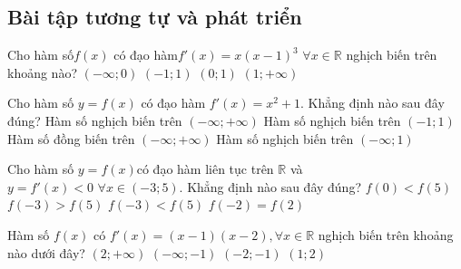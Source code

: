 \subsection{Bài tập tương tự và phát triển}
\begin{ex}%
	Cho hàm số$ f(x)$ có đạo hàm$f'(x)=x\left(x-1\right)^3\,\,\forall x\in \mathbb{R}$ nghịch biến trên khoảng nào?
	\choice
	{$\left(-\infty; 0\right)$}
	{$\left(-1; 1\right)$}
	{\True $\left(0; 1\right)$}
	{$\left(1; +\infty\right)$}
\end{ex}

\begin{ex}%
	Cho hàm số $y=f(x)$ có đạo hàm $f'(x)=x^2+1$. Khẳng định nào sau đây đúng?
	\choice
	{Hàm số nghịch biến trên $\left(-\infty; +\infty\right)$}
	{Hàm số nghịch biến trên $\left(-1; 1\right)$}
	{\True Hàm số đồng biến trên $\left(-\infty; +\infty\right)$}
	{Hàm số nghịch biến trên $\left(-\infty; 1\right)$}
\end{ex}

\begin{ex}%
	Cho hàm số $y=f(x)$có đạo hàm liên tục trên $\mathbb{R}$ và $y=f'(x)<0\,\, \forall x\in\left(-3; 5\right)$. Khẳng định nào sau đây đúng?
	\choice
	{$f(0)<f(5)$}
	{\True $f\left(-3\right)>f(5)$}
	{$f\left(-3\right)<f(5)$}
	{$f\left(-2\right)=f(2)$}
\end{ex}

\begin{ex}%
	Hàm số $f(x)$ có $f'(x)=\left(x-1\right)\left(x-2\right),\forall x\in \mathbb{R}$ nghịch biến trên khoảng nào dưới đây?
	\choice
	{$\left(2; +\infty\right)$}
	{$\left(-\infty; -1\right)$}
	{$\left(-2; -1\right)$}
	{\True $\left(1; 2\right)$}
\end{ex}

